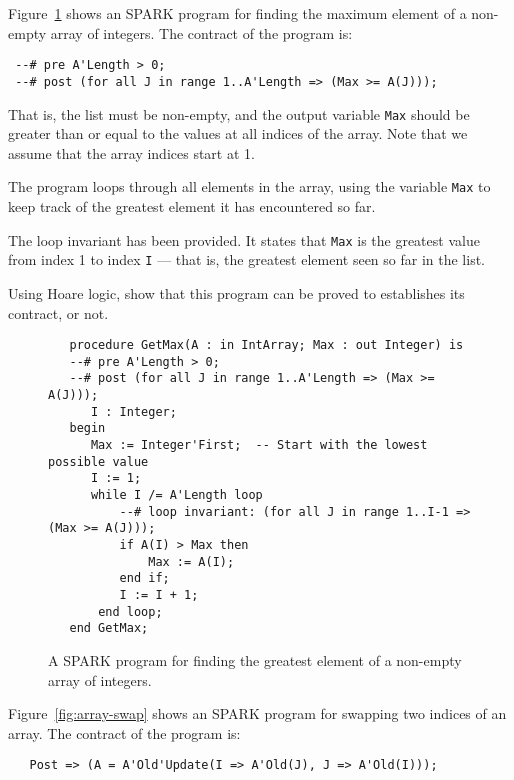\begin{omitable}
{
Figure~\ref{fig:hoare-program} shows an SPARK program for finding the maximum element of a non-empty array of integers. The contract of the program is:

\begin{verbatim}
 --# pre A'Length > 0;
 --# post (for all J in range 1..A'Length => (Max >= A(J)));
\end{verbatim}

That is, the list must be non-empty, and  the output variable \verb+Max+ should be greater than or equal to the values at all indices of the array. Note that we assume that the array indices start at 1.

The program loops through all elements in the array, using the variable \verb+Max+ to keep track of the greatest element it has encountered so far.

The loop invariant has been provided. It states that \verb+Max+ is the greatest value from index 1 to index \verb+I+ --- that is, the greatest element seen so far in the list.

Using Hoare logic, show that this program can be proved to establishes its contract, or not. 

\begin{figure}[!h]
\begin{verbatim}
   procedure GetMax(A : in IntArray; Max : out Integer) is
   --# pre A'Length > 0;
   --# post (for all J in range 1..A'Length => (Max >= A(J)));
      I : Integer;
   begin
      Max := Integer'First;  -- Start with the lowest possible value
      I := 1;
      while I /= A'Length loop
          --# loop invariant: (for all J in range 1..I-1 => (Max >= A(J)));
          if A(I) > Max then
              Max := A(I);
          end if;
          I := I + 1;
       end loop;      
   end GetMax;
\end{verbatim}

\caption{A SPARK program for finding the greatest element of a non-empty array of integers.}
\label{fig:hoare-program}
\end{figure}

}
\end{omitable}

Figure~\ref{fig:array-swap} shows an SPARK program for swapping two indices of an array. The contract of the program is:

\begin{verbatim}
   Post => (A = A'Old'Update(I => A'Old(J), J => A'Old(I)));
\end{verbatim}

